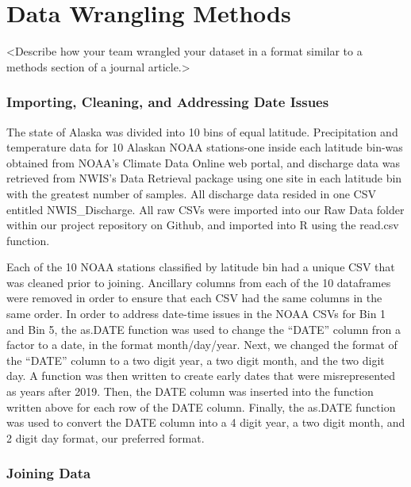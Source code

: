 \documentclass[12pt,]{article}
\begin{document}
\hypertarget{data-wrangling-methods}{%
\section{Data Wrangling Methods}\label{data-wrangling-methods}}

\textless{}Describe how your team wrangled your dataset in a format
similar to a methods section of a journal article.\textgreater{}

\hypertarget{importing-cleaning-and-addressing-date-issues}{%
\subsubsection{Importing, Cleaning, and Addressing Date
Issues}\label{importing-cleaning-and-addressing-date-issues}}

The state of Alaska was divided into 10 bins of equal latitude.
Precipitation and temperature data for 10 Alaskan NOAA stations-one
inside each latitude bin-was obtained from NOAA's Climate Data Online
web portal, and discharge data was retrieved from NWIS's Data Retrieval
package using one site in each latitude bin with the greatest number of
samples. All discharge data resided in one CSV entitled NWIS\_Discharge.
All raw CSVs were imported into our Raw Data folder within our project
repository on Github, and imported into R using the read.csv function.

Each of the 10 NOAA stations classified by latitude bin had a unique CSV
that was cleaned prior to joining. Ancillary columns from each of the 10
dataframes were removed in order to ensure that each CSV had the same
columns in the same order. In order to address date-time issues in the
NOAA CSVs for Bin 1 and Bin 5, the as.DATE function was used to change
the ``DATE'' column fron a factor to a date, in the format
month/day/year. Next, we changed the format of the ``DATE'' column to a
two digit year, a two digit month, and the two digit day. A function was
then written to create early dates that were misrepresented as years
after 2019. Then, the DATE column was inserted into the function written
above for each row of the DATE column. Finally, the as.DATE function was
used to convert the DATE column into a 4 digit year, a two digit month,
and 2 digit day format, our preferred format.

\hypertarget{joining-data}{%
\subsubsection{Joining Data}\label{joining-data}}
\end{document}
